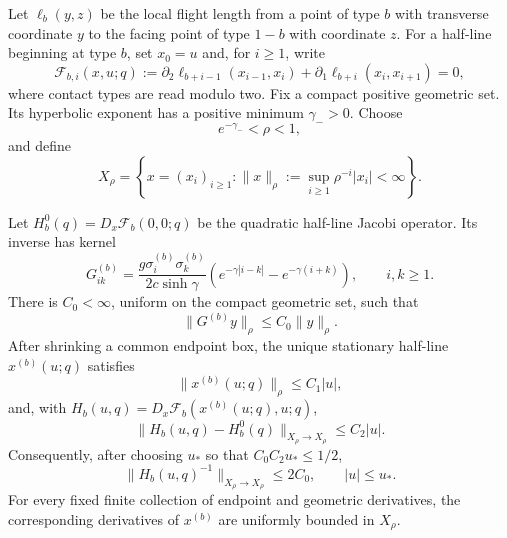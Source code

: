 Let $\ell_b(y,z)$ be the local flight length from a point of type $b$ with
transverse coordinate $y$ to the facing point of type $1-b$ with coordinate
$z$.  For a half-line beginning at type $b$, set $x_0=u$ and, for $i\ge1$,
write
\begin{equation}\label{eq:v22-stationary-equations}
 \mathscr F_{b,i}(x,u;q)
 :=\partial_2\ell_{b+i-1}(x_{i-1},x_i)
  +\partial_1\ell_{b+i}(x_i,x_{i+1})=0,
\end{equation}
where contact types are read modulo two.  Fix a compact positive geometric
set.  Its hyperbolic exponent has a positive minimum $\gamma_->0$.  Choose
\begin{equation}\label{eq:v22-rho-choice}
                     e^{-\gamma_-}<\rho<1,
\end{equation}
and define
\[
 X_\rho=\left\{x=(x_i)_{i\ge1}:
       \|x\|_\rho:=\sup_{i\ge1}\rho^{-i}|x_i|<\infty\right\}.
\]

\begin{lemma}
\label{lem:v22-weighted-inverse}
Let $H_b^0(q)=D_x\mathscr F_b(0,0;q)$ be the quadratic half-line Jacobi
operator.  Its inverse has kernel
\begin{equation}\label{eq:v22-half-green}
 G^{(b)}_{ik}=\frac{g\sigma_i^{(b)}\sigma_k^{(b)}}
 {2c\sinh\gamma}
 \left(e^{-\gamma|i-k|}-e^{-\gamma(i+k)}\right),
 \qquad i,k\ge1.
\end{equation}
There is $C_0<\infty$, uniform on the compact geometric set, such that
\begin{equation}\label{eq:v22-green-weighted-bound}
                  \|G^{(b)}y\|_\rho\le C_0\|y\|_\rho.
\end{equation}
After shrinking a common endpoint box, the unique stationary half-line
$x^{(b)}(u;q)$ satisfies
\begin{equation}\label{eq:v22-orbit-weight}
                  \|x^{(b)}(u;q)\|_\rho\le C_1|u|,
\end{equation}
and, with
$H_b(u,q)=D_x\mathscr F_b(x^{(b)}(u;q),u;q)$,
\begin{equation}\label{eq:v22-hessian-perturbation}
 \|H_b(u,q)-H_b^0(q)\|_{X_\rho\to X_\rho}\le C_2|u|.
\end{equation}
Consequently, after choosing $u_*$ so that $C_0C_2u_*\le1/2$,
\begin{equation}\label{eq:v22-uniform-inverse}
          \|H_b(u,q)^{-1}\|_{X_\rho\to X_\rho}\le2C_0,
          \qquad |u|\le u_*.
\end{equation}
For every fixed finite collection of endpoint and geometric derivatives, the
corresponding derivatives of $x^{(b)}$ are uniformly bounded in $X_\rho$.
\end{lemma}

